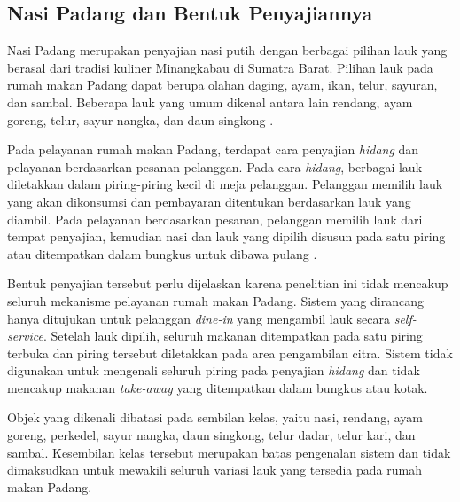 \subsection{Nasi Padang dan Bentuk Penyajiannya}

Nasi Padang merupakan penyajian nasi putih dengan berbagai pilihan lauk yang berasal dari tradisi kuliner Minangkabau di Sumatra Barat. Pilihan lauk pada rumah makan Padang dapat berupa olahan daging, ayam, ikan, telur, sayuran, dan sambal. Beberapa lauk yang umum dikenal antara lain rendang, ayam goreng, telur, sayur nangka, dan daun singkong \cite{indonesiaTravelPadang,michelinNasiPadang}.

Pada pelayanan rumah makan Padang, terdapat cara penyajian \textit{hidang} dan pelayanan berdasarkan pesanan pelanggan. Pada cara \textit{hidang}, berbagai lauk diletakkan dalam piring-piring kecil di meja pelanggan. Pelanggan memilih lauk yang akan dikonsumsi dan pembayaran ditentukan berdasarkan lauk yang diambil. Pada pelayanan berdasarkan pesanan, pelanggan memilih lauk dari tempat penyajian, kemudian nasi dan lauk yang dipilih disusun pada satu piring atau ditempatkan dalam bungkus untuk dibawa pulang \cite{indonesiaTravelPadang,michelinNasiPadang}.

Bentuk penyajian tersebut perlu dijelaskan karena penelitian ini tidak mencakup seluruh mekanisme pelayanan rumah makan Padang. Sistem yang dirancang hanya ditujukan untuk pelanggan \textit{dine-in} yang mengambil lauk secara \textit{self-service}. Setelah lauk dipilih, seluruh makanan ditempatkan pada satu piring terbuka dan piring tersebut diletakkan pada area pengambilan citra. Sistem tidak digunakan untuk mengenali seluruh piring pada penyajian \textit{hidang} dan tidak mencakup makanan \textit{take-away} yang ditempatkan dalam bungkus atau kotak.

Objek yang dikenali dibatasi pada sembilan kelas, yaitu nasi, rendang, ayam goreng, perkedel, sayur nangka, daun singkong, telur dadar, telur kari, dan sambal. Kesembilan kelas tersebut merupakan batas pengenalan sistem dan tidak dimaksudkan untuk mewakili seluruh variasi lauk yang tersedia pada rumah makan Padang.

